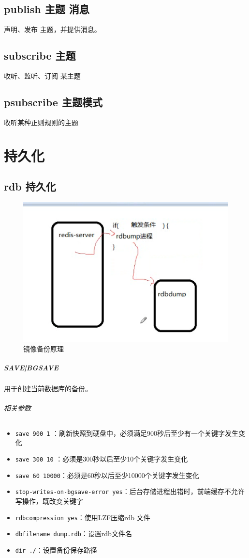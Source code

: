 \documentclass[UTF8,a4paper,12pt]{ctexbook}
\begin{document}
	\section{publish 主题  消息} 声明、发布 主题，并提供消息。
	
	\section{subscribe 主题} 收听、监听、订阅 某主题

	\section{psubscribe 主题模式} 收听某种正则规则的主题
	
\chapter{持久化}	
	\section{rdb 持久化}
		\begin{figure}[H]
			\centering
			\includegraphics[scale=1]{rdb}
			\caption{镜像备份原理}
		\end{figure}
			
		\paragraph{SAVE|BGSAVE}
			用于创建当前数据库的备份。
			
			\subparagraph{相关参数}
				\begin{itemize}[itemindent = 1em]
					\item \verb|save 900 1| ：刷新快照到硬盘中，必须满足900秒后至少有一个关键字发生变化
					\item \verb|save 300 10| ：必须是300秒以后至少10个关键字发生变化
					\item \verb|save 60 10000|：必须是60秒以后至少10000个关键字发生变化
					\item \verb|stop-writes-on-bgsave-error yes|：后台存储进程出错时，前端缓存不允许写操作，既改变关键字
					\item \verb|rdbcompression yes|：使用LZF压缩rdb 文件
					\item \verb|dbfilename dump.rdb|：设置rdb文件名
					\item \verb|dir ./|：设置备份保存路径
				\end{itemize}
				
\end{document}
